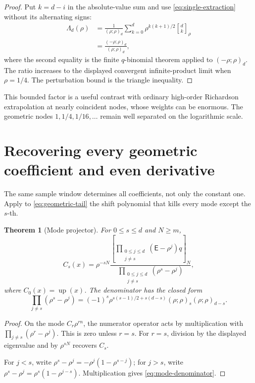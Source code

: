 \documentclass[11pt,oneside]{article}
\newtheorem{theorem}{Theorem}[section]
\theoremstyle{definition}
\theoremstyle{remark}
\newcommand{\up}{\operatorname{up}}
\newcommand{\E}{\mathsf E}
\newcommand{\qbinom}[3]{\genfrac{[}{]}{0pt}{}{#1}{#2}_{#3}}
\begin{document}
\begin{proof}
Put \(k=d-i\) in the absolute-value sum and use
\eqref{eq:single-extraction} without its alternating signs:
\begin{align*}
 \Lambda_d(\rho)
 &=\frac1{(\rho;\rho)_d}
 \sum_{k=0}^{d}\rho^{k(k+1)/2}\qbinom{d}{k}{\rho}\\
 &=\frac{(-\rho;\rho)_d}{(\rho;\rho)_d},
\end{align*}
where the second equality is the finite \(q\)-binomial theorem applied to
\((-\rho;\rho)_d\).  The ratio increases to the displayed convergent infinite-product limit when
\(\rho=1/4\).  The perturbation bound is
the triangle inequality.
\end{proof}

This bounded factor is a useful contrast with ordinary high-order Richardson
extrapolation at nearly coincident nodes, whose weights can be enormous.  The
geometric nodes \(1,1/4,1/16,\ldots\) remain well separated on the logarithmic
scale.

\section{Recovering every geometric coefficient and even derivative}

The same sample window determines all coefficients, not only the constant
one.  Apply to \eqref{eq:geometric-tail} the shift polynomial that kills every
mode except the \(s\)-th.

\begin{theorem}[Mode projector]\label{thm:mode-projector}
For \(0\le s\le d\) and \(N\ge m\),
\begin{equation}\label{eq:mode-projector}
 \boxed{\displaystyle
 C_s(x)=\rho^{-sN}
 \frac{\left[\displaystyle\prod_{\substack{0\le j\le d\\j\ne s}}
 (\E-\rho^j)q\right]_N}
 {\displaystyle\prod_{\substack{0\le j\le d\\j\ne s}}
 (\rho^s-\rho^j)},}
\end{equation}
where \(C_0(x)=\up(x)\).  The denominator has the closed form
\begin{equation}\label{eq:mode-denominator}
 \boxed{\displaystyle
 \prod_{j\ne s}(\rho^s-\rho^j)
 =(-1)^s\rho^{s(s-1)/2+s(d-s)}
 (\rho;\rho)_s(\rho;\rho)_{d-s}.}
\end{equation}
\end{theorem}

\begin{proof}
On the mode \(C_r\rho^{rn}\), the numerator operator acts by multiplication
with \(\prod_{j\ne s}(\rho^r-\rho^j)\).  This is zero unless \(r=s\).  For
\(r=s\), division by the displayed eigenvalue and by \(\rho^{sN}\) recovers
\(C_s\).

For \(j<s\), write
\(\rho^s-\rho^j=-\rho^j(1-\rho^{s-j})\); for \(j>s\), write
\(\rho^s-\rho^j=\rho^s(1-\rho^{j-s})\).  Multiplication gives
\eqref{eq:mode-denominator}.
\end{proof}
\end{document}

